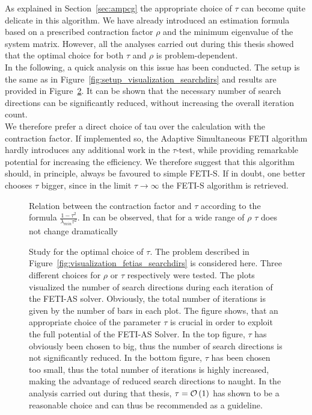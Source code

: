 As explained in Section~\ref{sec:ampcg} the appropriate choice of $\tau$ can become quite delicate in this algorithm. We have already introduced an estimation formula based on a prescribed contraction factor $\rho$ and the minimum eigenvalue of the system matrix. However, all the analyses carried out during this thesis showed that the optimal choice for both $\tau$ and $\rho$ is problem-dependent.\\
In the following, a quick analysis on this issue has been conducted. The setup is the same as in Figure~\ref{fig:setup_visualization_searchdirs} and results are provided in Figure~\ref{fig:results_study_contractfac}. It can be shown that the necessary number of search directions can be significantly reduced, without increasing the overall iteration count.\\
We therefore prefer a direct choice of tau over the calculation with the contraction factor. If implemented so, the Adaptive Simultaneous FETI algorithm hardly introduces any additional work in the $\tau$-test, while providing remarkable potential for increasing the efficiency. We therefore suggest that this algorithm should, in principle, always be favoured to simple FETI-S. If in doubt, one better chooses $\tau$ bigger, since in the limit $\tau \rightarrow \infty$ the FETI-S algorithm is retrieved.


\begin{figure}[ht]
  \begin{center}
    
    \caption[Visualization $\tau$-$\rho$ relation]{Relation between the contraction factor and $\tau$ according to the formula $\frac{1-\tau^2}{\lambda_{min} \tau^2}$. In can be observed, that for a wide range of $\rho$ $\tau$ does not change dramatically}
    \label{fig:fetias_tau_formula}
  \end{center}
\end{figure}


\begin{figure}[ht]
  \begin{center}
    
    \caption[Choice of $\tau$ - problem 1]{Study for the optimal choice of $\tau$. The problem described in Figure~\ref{fig:visualization_fetias_searchdirs} is considered here. Three different choices for $\rho$ or $\tau$ respectively were tested. The plots visualized the number of search directions during each iteration of the FETI-AS solver. Obviously, the total number of iterations is given by the number of bars in each plot. The figure shows, that an appropriate choice of the parameter $\tau$ is crucial in order to exploit the full potential of the FETI-AS Solver. In the top figure, $\tau$ has obviously been chosen to big, thus the number of search directions is not significantly reduced. In the bottom figure, $\tau$ has been chosen too small, thus the total number of iterations is highly increased, making the advantage of reduced search directions to naught. In the analysis carried out during that thesis, $\tau=\mathcal{O}\left(1\right)$ has shown to be a reasonable choice and can thus be recommended as a guideline.}
    \label{fig:results_study_contractfac}
  \end{center}
\end{figure}


